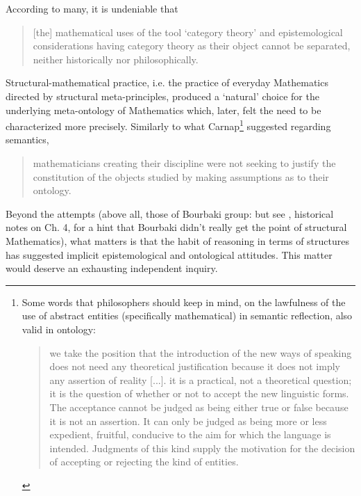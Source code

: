 According to many, it is undeniable that
\begin{quote}
	[the] mathematical uses of the tool `category theory' and epistemological considerations having category theory as their object cannot be separated, neither historically nor philosophically. \cite{kromer2007tool}
\end{quote}
Structural-mathematical practice, i.e. the practice of everyday Mathematics directed by structural meta-principles, produced a `natural' choice for the underlying meta-ontology of Mathematics
 which, later, felt the need to be characterized more precisely. Similarly to what Carnap\footnote{Some words that philosophers should keep in mind, on the lawfulness of the use of abstract entities (specifically mathematical) in semantic reflection, also valid in ontology:
	\begin{quote}
		we take the position that the introduction of the new ways of speaking does not need any theoretical justification because it does not imply any assertion of reality [...].  it is a practical, not a theoretical question; it is the question of whether or not to accept the new linguistic forms. The acceptance cannot be judged as being either true or false because it is not an assertion. It can only be judged as being more or less expedient, fruitful, conducive to the aim for which the language is intended. Judgments of this kind supply the motivation for the decision of accepting or rejecting the kind of entities. \hfill \cite{carnap1956meaning}
	\end{quote}} suggested regarding semantics,
\begin{quote}
	mathematicians creating their discipline were not seeking to justify the constitution of the objects studied by making assumptions as to their ontology.\hfill  \cite{kromer2007tool}
\end{quote}
Beyond the attempts (above all, those of Bourbaki group: but see \cite{McL}, historical notes on Ch. 4, for a hint that Bourbaki didn't really get the point of structural Mathematics), what matters is that the habit of reasoning in terms of structures has suggested implicit epistemological and ontological attitudes. This matter would deserve an exhausting independent inquiry.

